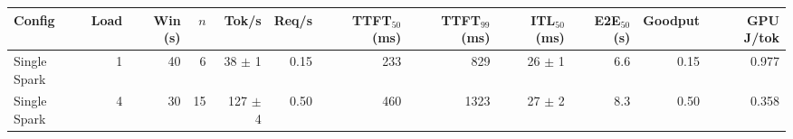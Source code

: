 \begin{tabular}{l r r r r r r r r r r r}
\toprule
Config & Load & Win (s) & $n$ & Tok/s & Req/s & TTFT$_{50}$ (ms) & TTFT$_{99}$ (ms) & ITL$_{50}$ (ms) & E2E$_{50}$ (s) & Goodput & GPU J/tok \\
\midrule
Single Spark & 1 & 40 & 6\rlap{$^\dagger$} & 38 $\pm$ 1 & 0.15 & 233 & 829 & 26 $\pm$ 1 & 6.6 & 0.15 & 0.977 \\
Single Spark & 4 & 30 & 15\rlap{$^\dagger$} & 127 $\pm$ 4 & 0.50 & 460 & 1323 & 27 $\pm$ 2 & 8.3 & 0.50 & 0.358 \\
\bottomrule
\end{tabular}
